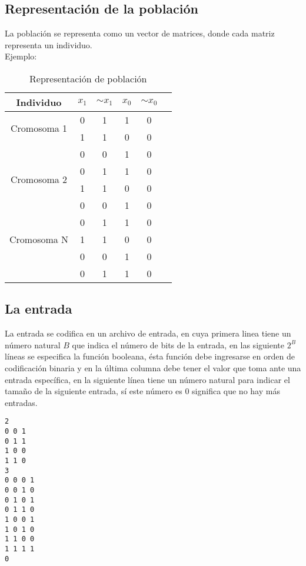 \documentclass[a4paper]{article}
\begin{document}
\subsection{Representación de la población}

La población se representa como un vector de matrices, donde cada matriz representa un individuo.\\
Ejemplo:
\begin{table}[H]
	\centering
	\caption{Representación de población}
	\begin{tabular}{| c |c | c | c|  c|  c|}
		\hline
		Individuo & $x_1$ & $ \sim{x_1}$ & $x_0$ & $ \sim{x_0}$\\
		\hline
		\multirow{2}{4cm}{Cromosoma 1} &0 & 1& 1 & 0\\
		\cline{2-5}
		& 1 & 1& 0 & 0\\
		\cline{2-5}
		& 0 & 0& 1 & 0\\
		\hline
		\hline
		\multirow{2}{4cm}{Cromosoma 2}  & 0 & 1& 1 & 0\\
		\cline{2-5}
		& 1 & 1& 0 & 0\\
		\cline{2-5}
		& 0 & 0& 1 & 0\\
		\hline
		\hline
		\multirow{3}{4cm}{Cromosoma N}  & 0 & 1& 1 & 0\\
		\cline{2-5}
		& 1 & 1& 0 & 0\\
		\cline{2-5}
		& 0 & 0& 1 & 0\\
		\cline{2-5}
		& 0 & 1& 1 & 0\\
		\hline
	\end{tabular}
\end{table}



\subsection{La entrada}

La entrada se codifica en un archivo de entrada, en cuya primera linea tiene un número natural $B$ que indica el número de bits de la entrada, en las siguiente $2^B$ líneas se especifica la función booleana, ésta función debe ingresarse en orden de codificación binaria y en la última columna debe tener el valor que toma ante una entrada específica, en la siguiente línea tiene un número natural para indicar el tamaño de la siguiente entrada, sí este número es $0$ significa que no hay más entradas.

\lstset{frameround=fttt}
\begin{lstlisting}[frame=trBL]
2
0 0 1
0 1 1
1 0 0
1 1 0
3
0 0 0 1
0 0 1 0 
0 1 0 1
0 1 1 0
1 0 0 1
1 0 1 0
1 1 0 0
1 1 1 1
0
\end{lstlisting}
\end{document}
